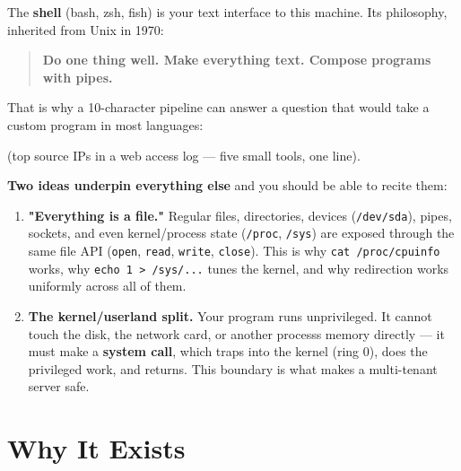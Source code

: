 \documentclass[11pt]{article}
\newenvironment{Shaded}{\begin{snugshade}}{\end{snugshade}}
\newcommand{\AttributeTok}[1]{\textcolor[rgb]{0.16,0.50,0.73}{#1}}
\newcommand{\FunctionTok}[1]{\textcolor[rgb]{0.56,0.27,0.68}{#1}}
\newcommand{\KeywordTok}[1]{\textcolor[rgb]{0.81,0.81,0.76}{\textbf{#1}}}
\newcommand{\NormalTok}[1]{\textcolor[rgb]{0.81,0.81,0.76}{#1}}
\newcommand{\StringTok}[1]{\textcolor[rgb]{0.96,0.31,0.31}{#1}}
\begin{document}
The \textbf{shell} (bash, zsh, fish) is your text interface to this machine. Its philosophy, inherited from Unix in 1970:

\begin{quote}
\textbf{Do one thing well. Make everything text. Compose programs with pipes.}
\end{quote}

That is why a 10-character pipeline can answer a question that would take a custom program in most languages:


\begin{Shaded}
\end{Shaded}

(top source IPs in a web access log --- five small tools, one line).

\textbf{Two ideas underpin everything else} and you should be able to recite them:

\begin{enumerate}
\def\labelenumi{\arabic{enumi}.}
\item
  \textbf{"Everything is a file."} Regular files, directories, devices (\texttt{/dev/sda}), pipes, sockets, and even kernel/process state (\texttt{/proc}, \texttt{/sys}) are exposed through the same file API (\texttt{open}, \texttt{read}, \texttt{write}, \texttt{close}). This is why \texttt{cat\ /proc/cpuinfo} works, why \texttt{echo\ 1\ \textgreater{}\ /sys/...} tunes the kernel, and why redirection works uniformly across all of them.
\item
  \textbf{The kernel/userland split.} Your program runs unprivileged. It cannot touch the disk, the network card, or another process\textquotesingle s memory directly --- it must make a \textbf{system call}, which traps into the kernel (ring 0), does the privileged work, and returns. This boundary is what makes a multi-tenant server safe.
\end{enumerate}

\section{Why It Exists}\label{why-it-exists}
\end{document}
